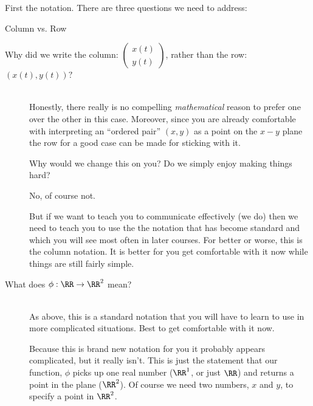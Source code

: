 First the notation. There are three questions we need to address:
\begin{mynotation}{Column vs. Row}
  \begin{description}
  \item[Why did we write the column:
    $\begin{pmatrix}
      x(t)\\
      y(t)
    \end{pmatrix}$, rather than the row: $(x(t), y(t))?$]
    \ \\
    Honestly, there really is no compelling \emph{mathematical} reason
    to prefer one over the other in this case. Moreover, since you are
    already comfortable with interpreting an ``ordered pair''
    $(x, y)$ as a point on the $x-y$ plane the row for a good case can
    be made for sticking with it.

    Why would we change this on you? Do we simply enjoy making things
    hard?

    No, of course not.
    
    But if we want to teach you to communicate effectively (we do)
    then we need to teach you to use the the notation that has become
    standard and which you will see most often in later courses. For
    better or worse, this is the column notation. It is better for
    you get comfortable with it now while things are still fairly
    simple.
  \item[What does $\phi:\RR\rightarrow\RR^2$ mean?]
    \ \\
    As above, this is a standard notation that you will have to learn
    to use in more complicated situations. Best to get comfortable
    with it now.
    
    Because this is brand new notation for you it probably appears
    complicated, but it really isn't.  This is just the statement that
    our function, $\phi$ picks up one real number ($\RR^1$, or just
    $\RR$) and returns  a point in the plane ($\RR^2$). Of course
    we need two numbers, $x$ and $y$, to specify a point in $\RR^2$.


\end{description}
\end{mynotation}

